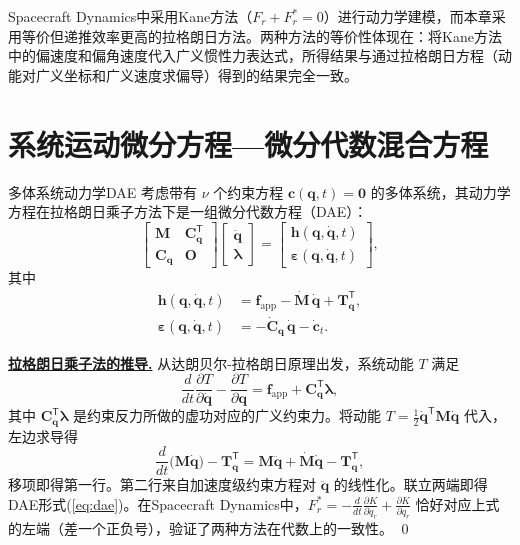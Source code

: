 \documentclass[10pt,a4paper]{book}
\theoremstyle{thmstyle}
\theoremstyle{defstyle}
\theoremstyle{prostyle}
\renewenvironment{proof}[1][证明]{\par{\kaishu \underline{\textbf{#1.}}} \;\fangsong}{\qed\par}
\newcommand{\T}{^{\mathsf{T}}}
\renewcommand{\vec}[1]{\bm{#1}}
\newcommand{\mat}[1]{\bm{#1}}
\begin{document}
Spacecraft Dynamics中采用Kane方法（$F_r + F_r^* = 0$）进行动力学建模，而本章采用等价但递推效率更高的拉格朗日方法。两种方法的等价性体现在：将Kane方法中的偏速度和偏角速度代入广义惯性力表达式，所得结果与通过拉格朗日方程（动能对广义坐标和广义速度求偏导）得到的结果完全一致。

\section{系统运动微分方程---微分代数混合方程}

\begin{myTheorem}{多体系统动力学DAE}
考虑带有 $\nu$ 个约束方程 $\vec{c}(\vec{q},t)=\vec{0}$ 的多体系统，其动力学方程在拉格朗日乘子方法下是一组微分代数方程（DAE）：
\begin{equation}
\begin{bmatrix}
\mat{M} & \mat{C}_{\vec{q}}\T \\
\mat{C}_{\vec{q}} & \mat{O}
\end{bmatrix}
\begin{bmatrix}
\ddot{\vec{q}} \\
\vec{\lambda}
\end{bmatrix}
=
\begin{bmatrix}
\vec{h}(\vec{q},\dot{\vec{q}},t) \\
\vec{\varepsilon}(\vec{q},\dot{\vec{q}},t)
\end{bmatrix},
\label{eq:dae}
\end{equation}
其中
\begin{align}
\vec{h}(\vec{q},\dot{\vec{q}},t) &= \vec{f}_{\mathrm{app}} - \dot{\mat{M}}\,\dot{\vec{q}} + \mat{T}_{\vec{q}}\T, \label{eq:h_def} \\
\vec{\varepsilon}(\vec{q},\dot{\vec{q}},t) &= -\dot{\mat{C}}_{\vec{q}}\,\dot{\vec{q}} - \dot{\vec{c}}_t.
\label{eq:eps_def}
\end{align}
\end{myTheorem}

\begin{proof}[拉格朗日乘子法的推导]
从达朗贝尔-拉格朗日原理出发，系统动能 $T$ 满足
\[
\frac{d}{dt}\frac{\partial T}{\partial\dot{\vec{q}}} - \frac{\partial T}{\partial\vec{q}}
= \vec{f}_{\mathrm{app}} + \mat{C}_{\vec{q}}\T\vec{\lambda},
\]
其中 $\mat{C}_{\vec{q}}\T\vec{\lambda}$ 是约束反力所做的虚功对应的广义约束力。将动能 $T = \frac{1}{2}\dot{\vec{q}}\T\mat{M}\dot{\vec{q}}$ 代入，左边求导得
\[
\frac{d}{dt}\bigl(\mat{M}\dot{\vec{q}}\bigr) - \mat{T}_{\vec{q}}\T
= \mat{M}\ddot{\vec{q}} + \dot{\mat{M}}\dot{\vec{q}} - \mat{T}_{\vec{q}}\T,
\]
移项即得第一行。第二行来自加速度级约束方程对 $\ddot{\vec{q}}$ 的线性化。联立两端即得DAE形式(\ref{eq:dae})。在Spacecraft Dynamics中，$F_r^* = -\frac{d}{dt}\frac{\partial K}{\partial\dot{q}_r} + \frac{\partial K}{\partial q_r}$ 恰好对应上式的左端（差一个正负号），验证了两种方法在代数上的一致性。
\end{proof}
\end{document}
